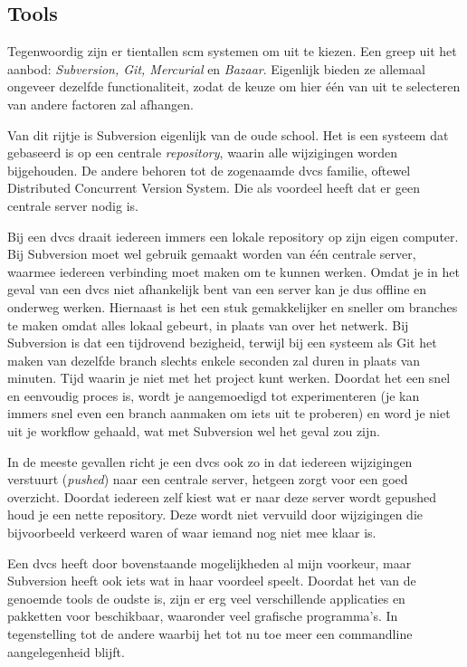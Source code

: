 \subsection{Tools}

Tegenwoordig zijn er tientallen {\sc scm} systemen om uit te kiezen. Een greep uit het aanbod: \emph{Subversion, Git, Mercurial} en \emph{Bazaar}. Eigenlijk bieden ze allemaal ongeveer dezelfde functionaliteit, zodat de keuze om hier één van uit te selecteren van andere factoren zal afhangen.

Van dit rijtje is Subversion eigenlijk van de oude school. Het is een systeem dat gebaseerd is op een centrale \emph{repository}, waarin alle wijzigingen worden bijgehouden. De andere behoren tot de zogenaamde {\sc dvcs} familie, oftewel Distributed Concurrent Version System. Die als voordeel heeft dat er geen centrale server nodig is.

Bij een {\sc dvcs} draait iedereen immers een lokale repository op zijn eigen computer. Bij Subversion moet wel gebruik gemaakt worden van één centrale server, waarmee iedereen verbinding moet maken om te kunnen werken. Omdat je in het geval van een {\sc dvcs} niet afhankelijk bent van een server kan je dus offline en onderweg werken. Hiernaast is het een stuk gemakkelijker en sneller om branches te maken omdat alles lokaal gebeurt, in plaats van over het netwerk. Bij Subversion is dat een tijdrovend bezigheid, terwijl bij een systeem als Git het maken van dezelfde branch slechts enkele seconden zal duren in plaats van minuten. Tijd waarin je niet met het project kunt werken. Doordat het een snel en eenvoudig proces is, wordt je aangemoedigd tot experimenteren (je kan immers snel even een branch aanmaken om iets uit te proberen) en word je niet uit je workflow gehaald, wat met Subversion wel het geval zou zijn.

In de meeste gevallen richt je een {\sc dvcs} ook zo in dat iedereen wijzigingen verstuurt (\emph{pushed}) naar een centrale server, hetgeen zorgt voor een goed overzicht. Doordat iedereen zelf kiest wat er naar deze server wordt gepushed houd je een nette repository. Deze wordt niet vervuild door wijzigingen die bijvoorbeeld verkeerd waren of waar iemand nog niet mee klaar is.

Een {\sc dvcs} heeft door bovenstaande mogelijkheden al mijn voorkeur, maar Subversion heeft ook iets wat in haar voordeel speelt. Doordat het van de genoemde tools de oudste is, zijn er erg veel verschillende applicaties en pakketten voor beschikbaar, waaronder veel grafische programma's. In tegenstelling tot de andere waarbij het tot nu toe meer een commandline aangelegenheid blijft.

